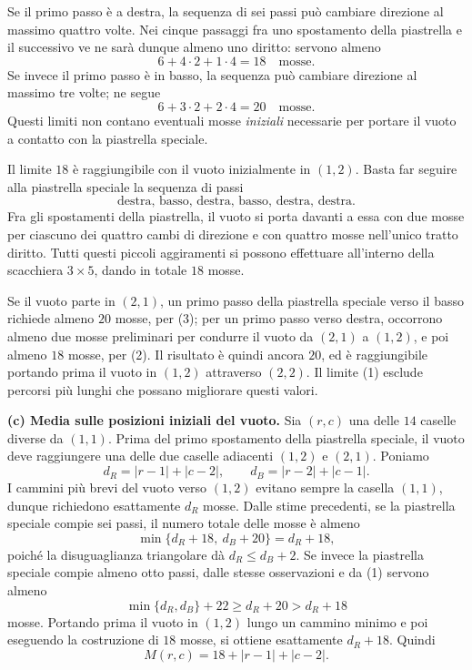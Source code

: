 {Se il primo passo \`e a destra, la sequenza di sei passi
pu\`o cambiare direzione al massimo quattro volte.
Nei cinque passaggi fra uno spostamento della piastrella
e il successivo ve ne sar\`a dunque almeno uno diritto:
servono almeno
\[
6+4\cdot2+1\cdot4=18\quad\text{mosse}. \tag{2}
\]
Se invece il primo passo \`e in basso, la sequenza pu\`o
cambiare direzione al massimo tre volte; ne segue
\[
6+3\cdot2+2\cdot4=20\quad\text{mosse}. \tag{3}
\]
Questi limiti non contano eventuali mosse \emph{iniziali}
necessarie per portare il vuoto a contatto con la piastrella speciale.

Il limite $18$ \`e raggiungibile con il vuoto inizialmente
in $(1,2)$. Basta far seguire alla piastrella speciale
la sequenza di passi
\[
 \text{destra, basso, destra, basso, destra, destra}.
\]
Fra gli spostamenti della piastrella, il vuoto si porta
davanti a essa con due mosse per ciascuno dei quattro
cambi di direzione e con quattro mosse nell'unico tratto diritto.
Tutti questi piccoli aggiramenti si possono effettuare
all'interno della scacchiera $3\times5$, dando in totale $18$ mosse.

Se il vuoto parte in $(2,1)$, un primo passo della
piastrella speciale verso il basso richiede almeno $20$ mosse,
per (3); per un primo passo verso destra, occorrono
almeno due mosse preliminari per condurre il vuoto da
$(2,1)$ a $(1,2)$, e poi almeno $18$ mosse, per (2).
Il risultato \`e quindi ancora $20$, ed \`e raggiungibile
portando prima il vuoto in $(1,2)$ attraverso $(2,2)$.
Il limite (1) esclude percorsi pi\`u lunghi che possano migliorare
questi valori.

\textbf{(c) Media sulle posizioni iniziali del vuoto.}
Sia $(r,c)$ una delle $14$ caselle diverse da $(1,1)$.
Prima del primo spostamento della piastrella speciale,
il vuoto deve raggiungere una delle due caselle adiacenti
$(1,2)$ e $(2,1)$. Poniamo
\[
 d_R=|r-1|+|c-2|,\qquad d_B=|r-2|+|c-1|.
\]
I cammini pi\`u brevi del vuoto verso $(1,2)$ evitano
sempre la casella $(1,1)$, dunque richiedono esattamente
$d_R$ mosse. Dalle stime precedenti, se la piastrella speciale
compie sei passi, il numero totale delle mosse \`e almeno
\[
 \min\{d_R+18,\ d_B+20\}=d_R+18,
\]
poich\'e la disuguaglianza triangolare d\`a $d_R\le d_B+2$.
Se invece la piastrella speciale compie almeno otto passi,
dalle stesse osservazioni e da (1) servono almeno
\[
\min\{d_R,d_B\}+22\ge d_R+20>d_R+18
\]
mosse. Portando prima il vuoto in $(1,2)$ lungo un cammino
minimo e poi eseguendo la costruzione di $18$ mosse,
si ottiene esattamente $d_R+18$. Quindi
\[
 \boxed{M(r,c)=18+|r-1|+|c-2|.}
\]

}
